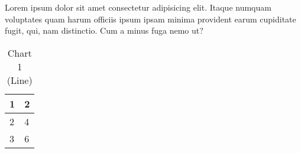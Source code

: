\documentclass[preprint,12pt]{elsarticle}
\begin{document}
Lorem ipsum dolor sit amet consectetur adipisicing elit. Itaque numquam voluptates quam harum officiis ipsum ipsam minima provident earum cupiditate fugit, qui, nam distinctio. Cum a minus fuga nemo ut?

\begin{table}[ht]
    \centering
    \begin{tabular}{ll}
        \toprule
        \textbf{1} & \textbf{2} \\
        \midrule
        2 & 4 \\
        3 & 6 \\
        \bottomrule
    \end{tabular}
    \caption{Chart 1 (Line)}
    \vspace{1em}
\end{table}
\end{document}
